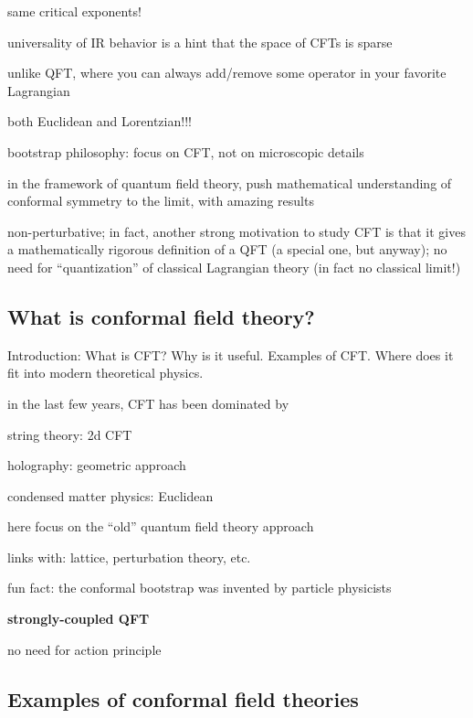 \documentclass[a4paper,12pt]{article}
\numberwithin{equation}{section}
\begin{document}
same critical exponents!

universality of IR behavior is a hint that the space of CFTs is sparse

unlike QFT, where you can always add/remove some operator in your favorite Lagrangian

both Euclidean and Lorentzian!!!


bootstrap philosophy: focus on CFT, not on microscopic details

in the framework of quantum field theory, push mathematical understanding of conformal symmetry to the limit, with amazing results


non-perturbative;
in fact, another strong motivation to study CFT is that it gives a mathematically rigorous definition of a QFT (a special one, but anyway);
no need for ``quantization'' of classical Lagrangian theory (in fact no classical limit!)




\subsection{What is conformal field theory?}

Introduction: What is CFT? Why is it useful. Examples of CFT. Where does it fit into modern theoretical physics.


in the last few years, CFT has been dominated by 

string theory: 2d CFT

holography: geometric approach

condensed matter physics: Euclidean


here focus on the ``old'' quantum field theory approach

links with: lattice, perturbation theory, etc.

fun fact: the conformal bootstrap was invented by particle physicists


\textbf{strongly-coupled QFT}

no need for action principle


\subsection{Examples of conformal field theories}
\end{document}
